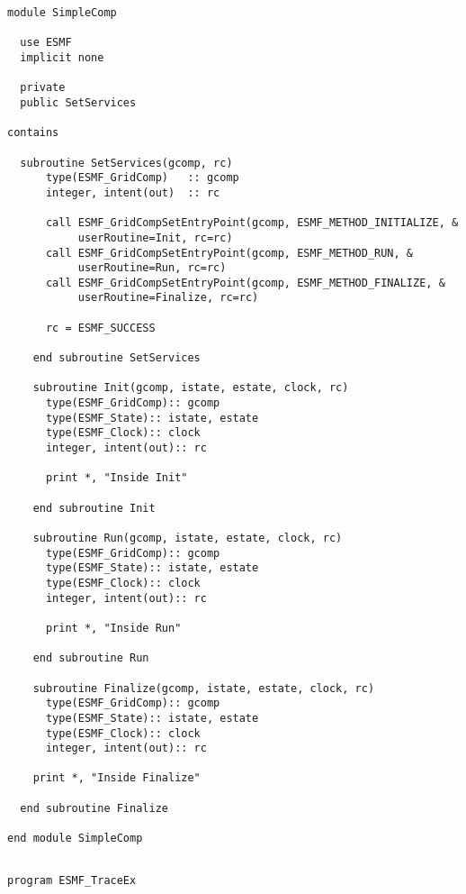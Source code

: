  \begin{verbatim}
module SimpleComp

  use ESMF
  implicit none

  private
  public SetServices

contains

  subroutine SetServices(gcomp, rc)
      type(ESMF_GridComp)   :: gcomp
      integer, intent(out)  :: rc  

      call ESMF_GridCompSetEntryPoint(gcomp, ESMF_METHOD_INITIALIZE, &
           userRoutine=Init, rc=rc)
      call ESMF_GridCompSetEntryPoint(gcomp, ESMF_METHOD_RUN, &
           userRoutine=Run, rc=rc)
      call ESMF_GridCompSetEntryPoint(gcomp, ESMF_METHOD_FINALIZE, &
           userRoutine=Finalize, rc=rc)
      
      rc = ESMF_SUCCESS
      
    end subroutine SetServices

    subroutine Init(gcomp, istate, estate, clock, rc)
      type(ESMF_GridComp):: gcomp
      type(ESMF_State):: istate, estate
      type(ESMF_Clock):: clock
      integer, intent(out):: rc
      
      print *, "Inside Init"
      
    end subroutine Init

    subroutine Run(gcomp, istate, estate, clock, rc)
      type(ESMF_GridComp):: gcomp
      type(ESMF_State):: istate, estate
      type(ESMF_Clock):: clock
      integer, intent(out):: rc
      
      print *, "Inside Run"
      
    end subroutine Run

    subroutine Finalize(gcomp, istate, estate, clock, rc)
      type(ESMF_GridComp):: gcomp
      type(ESMF_State):: istate, estate
      type(ESMF_Clock):: clock
      integer, intent(out):: rc
      
    print *, "Inside Finalize"
    
  end subroutine Finalize 

end module SimpleComp
 
\end{verbatim}
 

 \begin{verbatim}
program ESMF_TraceEx
 
\end{verbatim}
 

